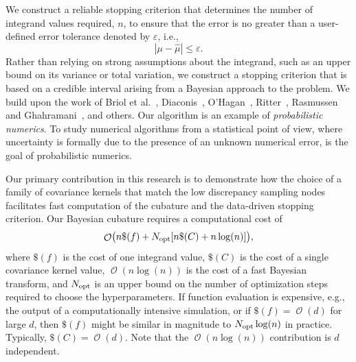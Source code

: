 \documentclass{iitthesis}          %
\DeclareMathOperator{\Order}{{\mathcal O}}
\newcommand{\hmu}{\widehat{\mu}}
\newcommand{\opt}{\textup{opt}}
\newcommand{\errtol}{\varepsilon}
\def\abs#1{\ensuremath{\left \lvert #1 \right \rvert}}
\newcommand{\JRNote}[1]{}
\begin{document}
We construct a reliable stopping criterion that determines the number of integrand values required, $n$, to ensure that the error is no greater than a user-defined error tolerance denoted by $\varepsilon$, i.e., 
\begin{equation}
\label{eqn:err_crit} 
\abs{\mu - \hmu} \leq \errtol .
\end{equation}
Rather than relying on strong assumptions about the integrand, such as an upper bound on its variance or total variation, we construct a stopping criterion that is based on a credible interval arising from a Bayesian approach to the problem.  We build upon the work of Briol et al.~\cite{BriEtal18a}, Diaconis~\cite{Dia88a}, O'Hagan~\cite{OHa91a}, Ritter~\cite{Rit00a}, Rasmussen and Ghahramani~\cite{RasGha03a}, and others.  Our algorithm is an example of \emph{probabilistic numerics}.
To study numerical algorithms from a statistical point of view, where uncertainty is formally due to the presence of an unknown numerical error, is the goal of probabilistic numerics.

\JRNote{Briefly explain Probabilistic numeric ..}



Our primary contribution in this research is to demonstrate how the choice of a family of covariance kernels that match the low discrepancy sampling nodes facilitates fast computation of the cubature and the data-driven stopping criterion.  Our Bayesian cubature requires a computational cost of
\begin{equation} \label{eqn:OuralgoCost}
\Order\bigl(n \$(f) + N_{\opt}[n\$(C) + 
n \log(n)] \bigr),
\end{equation} 
where $\$(f)$ is the cost of one integrand value, $\$(C)$ is the cost of a single covariance kernel value,  $\Order(n \log(n))$ is the cost of a fast Bayesian transform, and $N_{\opt}$ is an upper bound on the number of optimization steps required to choose the hyperparameters. If function evaluation is expensive, e.g., the output of a computationally intensive simulation, or if $\$(f) = \Order(d)$ for large $d$, then $\$(f)$ might be similar in magnitude to $N_{\opt} \log(n)$ in practice.  Typically, $\$(C) = \Order(d)$.  Note that the $\Order(n \log(n))$ contribution is $d$ independent.
\end{document}
